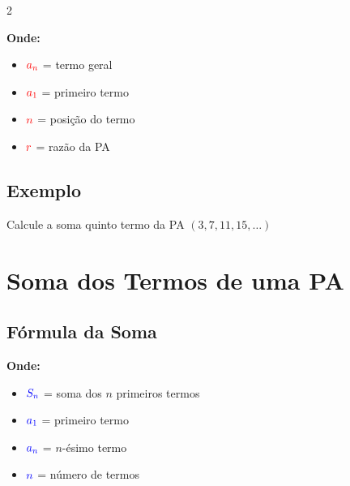 \documentclass[11pt]{article}
\begin{document}
\begin{multicols}{2}

\vspace{5mm}

\textbf{Onde:}
\begin{itemize}
\item $\textcolor{red}{a_n}$ = termo geral
\item $\textcolor{red}{a_1}$ = primeiro termo
\item $\textcolor{red}{n}$ = posição do termo
\item $\textcolor{red}{r}$ = razão da PA
\end{itemize}

\subsection*{Exemplo}

Calcule a soma quinto termo da PA $(3, 7, 11, 15, \ldots)$
\section*{Soma dos Termos de uma PA}

\subsection*{Fórmula da Soma}


\vspace{5mm}

\textbf{Onde:}
\begin{itemize}
\item $\textcolor{blue}{S_n}$ = soma dos $n$ primeiros termos
\item $\textcolor{blue}{a_1}$ = primeiro termo
\item $\textcolor{blue}{a_n}$ = $n$-ésimo termo
\item $\textcolor{blue}{n}$ = número de termos
\end{itemize}


\end{multicols}
\end{document}
